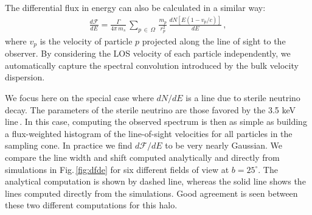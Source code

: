 \documentclass[aps,prd,10pt,twocolumn,superscriptaddress,showpacs]{revtex4-1}
\begin{document}
The differential flux in energy can also be calculated in a similar way:
\begin{eqnarray}
\label{eq:discrete}
\frac{d\mathcal{F}}{dE} = \frac{\Gamma}{4 \pi \, m_s}\, \sum_{p \, \in \, \Omega} \,
\frac{m_p}{r_p^{2}} \, \frac{dN[E(1-v_p/c)]}{dE} \, ,
\end{eqnarray}
where $v_p$ is the velocity of particle $p$ projected along the line of sight to the observer.  By
considering the LOS velocity of each particle independently, we automatically capture the spectral
convolution introduced by the bulk velocity dispersion. 

We focus here on the special case where $dN/dE$ is a line due to sterile neutrino decay.  The
parameters of the sterile neutrino are those favored by the 3.5 keV line\,\cite{Bulbul:2014sua}.  In
this case, computing the observed spectrum is then as simple as building a flux-weighted histogram
of the line-of-sight velocities for all particles in the sampling cone. In practice we find
$d\mathcal{F}/dE$ to be very nearly Gaussian. %
We compare the line width and shift computed analytically and directly from simulations in
Fig.\,\ref{fig:dfde} for six different fields of view at $b=25^\circ$.  The analytical computation is 
shown by dashed line, whereas the solid line shows the lines computed directly from the simulations.  
Good agreement is seen between these two different computations for this halo.

\end{document}
